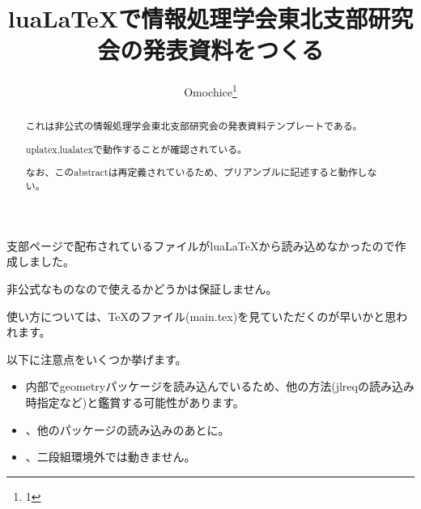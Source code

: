 \documentclass[twocolumn,paper=a4paper,landscape,fontsize=9pt]{jlreq}
\title{luaLaTeXで情報処理学会東北支部研究会の発表資料をつくる}
\author{Omochice\thanks{1}}
\begin{document}

\maketitle

\begin{abstract}
  これは非公式の情報処理学会東北支部研究会の発表資料テンプレートである。

  uplatex,lualatexで動作することが確認されている。

  なお、このabstractは再定義されているため、プリアンブルに記述すると動作しない。
\end{abstract}

支部ページ\cite{ipsjTohoku}で配布されているファイルがluaLaTeXから読み込めなかったので作成しました。

非公式なものなので使えるかどうかは保証しません。

使い方については、TeXのファイル(main.tex)を見ていただくのが早いかと思われます。

以下に注意点をいくつか挙げます。

\begin{itemize}
  \item 内部でgeometryパッケージを読み込んでいるため、他の方法(jlreqの読み込み時指定など)と鑑賞する可能性があります。
  \item \string{}\string{}、他のパッケージの読み込みのあとに\string{}。
  \item \string{}、二段組環境外では動きません。
\end{itemize}


\printbibliography[title=参考文献]
\end{document}
